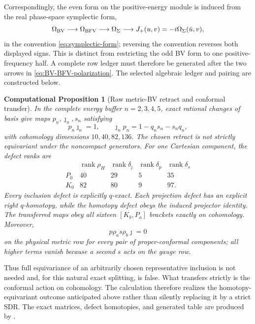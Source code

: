\documentclass[11pt]{article}
\newtheorem{cproposition}[theorem]{Computational Proposition}
\theoremstyle{definition}
\theoremstyle{remark}
\newcommand{\rank}{\operatorname{rank}}
\begin{document}
Correspondingly, the even form on the positive-energy module is induced
from the real phase-space symplectic form,
\begin{equation}\label{eq:pairing-pipeline}
 \Omega_{\rm BV}\longrightarrow\Omega_{\rm BFV}
 \longrightarrow\Omega_\Sigma
 \longrightarrow
 J_+(u,v)=-i\Omega_\Sigma(\bar u,v),
\end{equation}
in the convention \eqref{eq:symplectic-form}; reversing the convention
reverses both displayed signs.  This is distinct from
restricting the odd BV form to one positive-frequency half.  A complete row
ledger must therefore be generated after the two arrows in
\eqref{eq:BV-BFV-polarization}.  The selected algebraic ledger and pairing
are constructed below.

\begin{cproposition}[Raw metric-BV retract and conformal transfer]
\label{prop:raw-BV-transfer}
In the complete energy buffer $n=2,3,4,5$, exact rational changes of basis
give maps $p_n,\jmath_n,s_n$ satisfying
\begin{equation}
 p_n\jmath_n=1,
 \qquad
 \jmath_np_n=1-q_ns_n-s_nq_n,
\end{equation}
with cohomology dimensions $10,40,82,136$.  The chosen retract is not
strictly equivariant under the noncompact generators.  For one Cartesian
component, the defect ranks are
\begin{equation}\label{eq:raw-defect-ranks}
\begin{array}{c|rrrr}
 &\rank\rho_H&\rank\delta_{\jmath}&\rank\delta_p&\rank\delta_s\\
\hline
 P_0&40&29&5&35\\
 K_0&82&80&9&97.
\end{array}
\end{equation}
Every inclusion defect is explicitly $q$-exact.  Each projection defect has
an explicit right $q$-homotopy, while the homotopy defect obeys the induced
projector identity.  The transferred maps obey all sixteen $[K_b,P_a]$
brackets exactly on cohomology.  Moreover,
\begin{equation}\label{eq:physical-HPL-zero}
 p\rho_a s\rho_b\jmath=0
\end{equation}
on the physical metric row for every pair of proper-conformal components;
all higher terms vanish because a second $s$ acts on the gauge row.
\end{cproposition}

Thus full equivariance of an arbitrarily chosen representative inclusion is
not needed and, for this natural exact splitting, is false.  What transfers
strictly is the conformal action on cohomology.  The calculation therefore
realizes the homotopy-equivariant outcome anticipated above rather than
silently replacing it by a strict SDR.  The exact matrices, defect
homotopies, and generated table are produced by
.
\end{document}
